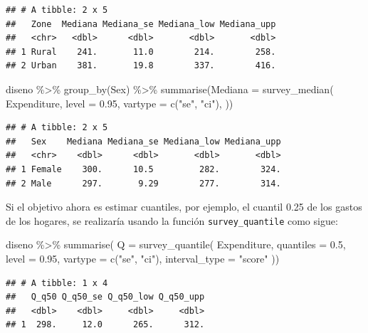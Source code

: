 \documentclass[
  12pt,
]{book}
\newenvironment{Shaded}{\begin{snugshade}}{\end{snugshade}}
\newcommand{\AttributeTok}[1]{\textcolor[rgb]{0.77,0.63,0.00}{#1}}
\newcommand{\FloatTok}[1]{\textcolor[rgb]{0.00,0.00,0.81}{#1}}
\newcommand{\FunctionTok}[1]{\textcolor[rgb]{0.00,0.00,0.00}{#1}}
\newcommand{\NormalTok}[1]{#1}
\newcommand{\SpecialCharTok}[1]{\textcolor[rgb]{0.00,0.00,0.00}{#1}}
\newcommand{\StringTok}[1]{\textcolor[rgb]{0.31,0.60,0.02}{#1}}
\begin{document}
\begin{verbatim}
## # A tibble: 2 x 5
##   Zone  Mediana Mediana_se Mediana_low Mediana_upp
##   <chr>   <dbl>      <dbl>       <dbl>       <dbl>
## 1 Rural    241.       11.0        214.        258.
## 2 Urban    381.       19.8        337.        416.
\end{verbatim}

\begin{Shaded}
\begin{Highlighting}[]
\NormalTok{diseno }\SpecialCharTok{\%\textgreater{}\%} \FunctionTok{group\_by}\NormalTok{(Sex) }\SpecialCharTok{\%\textgreater{}\%} 
  \FunctionTok{summarise}\NormalTok{(}\AttributeTok{Mediana =} 
  \FunctionTok{survey\_median}\NormalTok{(}
\NormalTok{    Expenditure,}
    \AttributeTok{level =} \FloatTok{0.95}\NormalTok{,}
    \AttributeTok{vartype =}  \FunctionTok{c}\NormalTok{(}\StringTok{"se"}\NormalTok{, }\StringTok{"ci"}\NormalTok{),}
\NormalTok{   ))}
\end{Highlighting}
\end{Shaded}

\begin{verbatim}
## # A tibble: 2 x 5
##   Sex    Mediana Mediana_se Mediana_low Mediana_upp
##   <chr>    <dbl>      <dbl>       <dbl>       <dbl>
## 1 Female    300.      10.5         282.        324.
## 2 Male      297.       9.29        277.        314.
\end{verbatim}

Si el objetivo ahora es estimar cuantiles, por ejemplo, el cuantil 0.25 de los gastos de los hogares, se realizaría usando la función \texttt{survey\_quantile} como sigue:

\begin{Shaded}
\begin{Highlighting}[]
\NormalTok{diseno }\SpecialCharTok{\%\textgreater{}\%} 
  \FunctionTok{summarise}\NormalTok{(}
    \AttributeTok{Q =}  \FunctionTok{survey\_quantile}\NormalTok{(}
\NormalTok{    Expenditure,}
    \AttributeTok{quantiles =} \FloatTok{0.5}\NormalTok{,}
    \AttributeTok{level =} \FloatTok{0.95}\NormalTok{,}
    \AttributeTok{vartype =}  \FunctionTok{c}\NormalTok{(}\StringTok{"se"}\NormalTok{, }\StringTok{"ci"}\NormalTok{),}
    \AttributeTok{interval\_type =} \StringTok{"score"}
\NormalTok{   ))}
\end{Highlighting}
\end{Shaded}

\begin{verbatim}
## # A tibble: 1 x 4
##   Q_q50 Q_q50_se Q_q50_low Q_q50_upp
##   <dbl>    <dbl>     <dbl>     <dbl>
## 1  298.     12.0      265.      312.
\end{verbatim}
\end{document}
